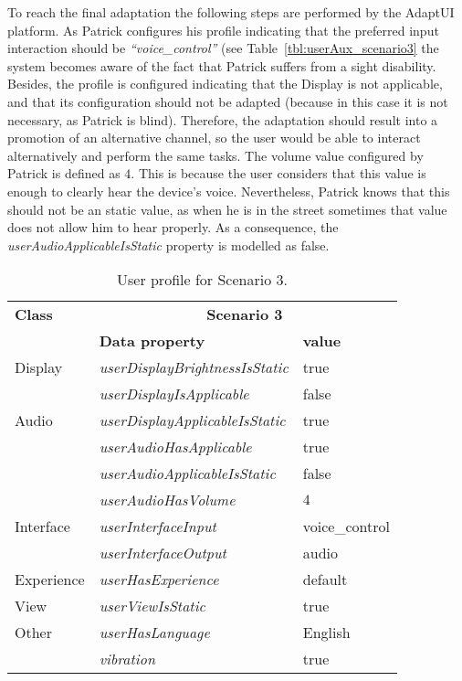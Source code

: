 To reach the final adaptation the following steps are performed by the AdaptUI
platform. As Patrick configures his profile indicating that the preferred input
interaction should be \textit{``voice\_control''} (see 
Table~\ref{tbl:userAux_scenario3} the system becomes aware of the fact that 
Patrick suffers from a sight disability. Besides, the profile is configured 
indicating that the Display is not applicable, and that its configuration 
should not be adapted (because in this case it is not necessary, as Patrick is 
blind). Therefore, the adaptation should result into a promotion of an 
alternative channel, so the user would be able to interact alternatively and 
perform the same tasks. The volume value configured by Patrick is defined as $4$. 
This is because the user considers that this value is enough to clearly hear 
the device's voice. Nevertheless, Patrick knows that this should not be an 
static value, as when he is in the street sometimes that value does not allow 
him to hear properly. As a consequence, the \textit{userAudioApplicableIsStatic}
property is modelled as false.

\begin{table}
 \caption{User profile for Scenario 3.}
 \label{tbl:user_profile_scenario3}
 \footnotesize
 \centering
\begin{tabular}{l l l}
  \hline 
  \textbf{Class}		& \multicolumn{2}{c}{\textbf{Scenario 3}}\\
		& \textbf{Data property} & \textbf{value}\\
  \hline
  Display 	& \textit{userDisplayBrightnessIsStatic}& true	\\
		& \textit{userDisplayIsApplicable} 	& false	\\
  Audio 	& \textit{userDisplayApplicableIsStatic}& true	\\
		& \textit{userAudioHasApplicable} 	& true	\\
		& \textit{userAudioApplicableIsStatic} 	& false	\\
		& \textit{userAudioHasVolume}  		& $4$ 	\\
  Interface 	& \textit{userInterfaceInput}		& voice\_control\\
		& \textit{userInterfaceOutput} 		& audio \\
  Experience	& \textit{userHasExperience} 		& default\\
  View		& \textit{userViewIsStatic}		& true	\\
  Other 	& \textit{userHasLanguage}		& English\\
		& \textit{vibration} 			& true 	\\
  \hline
\end{tabular}
\end{table}

